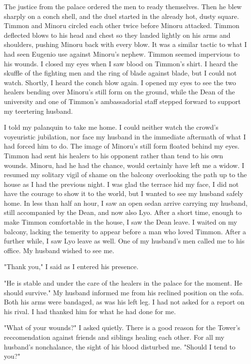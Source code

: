\documentclass{article}
\begin{document}
The justice from the palace ordered the men to ready themselves. Then he blew sharply on a conch shell, and the duel started in the already hot, dusty square. Timmon and Minoru circled each other twice before Minoru attacked. Timmon deflected blows to his head and chest so they landed lightly on his arms and shoulders, pushing Minoru back with every blow. It was a similar tactic to what I had seen Eugenio use against Minoru's nephew. Timmon seemed impervious to his wounds. I closed my eyes when I saw blood on Timmon's shirt. I heard the skuffle of the fighting men and the ring of blade against blade, but I could not watch. Shortly, I heard the conch blow again. I opened my eyes to see the two healers bending over Minoru's still form on the ground, while the Dean of the university and one of Timmon's ambassadorial staff stepped forward to support my teertering husband. 

I told my palanquin to take me home. I could neither watch the crowd's voyeuristic jubilation, nor face my husband in the immediate aftermath of what I had forced him to do. The image of Minoru's still form floated behind my eyes. Timmon had sent his healers to his opponent rather than tend to his own wounds. Minoru, had he had the chance, would certainly have left me a widow. I resumed my solitary vigil of shame on the balcony overlooking the path up to the house as I had the previous night. I was glad the terrace hid my face, I did not have the courage to show it to the world, but I wanted to see my husband safely home. In less than half an hour, I saw an open sedan arrive carrying my husband, still accompanied by the Dean, and now also Lyo. After a short time, enough to make Timmon comfortable in the house, I saw the Dean leave. I waited on my balcony, lacking the temerity to appear before a man who loved Timmon. After a further while, I saw Lyo leave as well. One of my husband's men called me to his office. My husband wished to see me. 

"Thank you," I said as I entered his presence.

"He is stable and under the care of the healers in the palace for the moment. He should survive." My husband informed me from his reclined position on the sofa. Both his arms were bandaged, as was his left leg. I had not asked for a report on his rival. I had thanked him for what he had done for me.

"What of your wounds?" I asked quietly. There is a good reason for the Tower's reccomendation against friends and siblings healing each other. For all my husband's nonchalance, the sight of his blood disturbed me. "Should I tend to you?"
\end{document}
